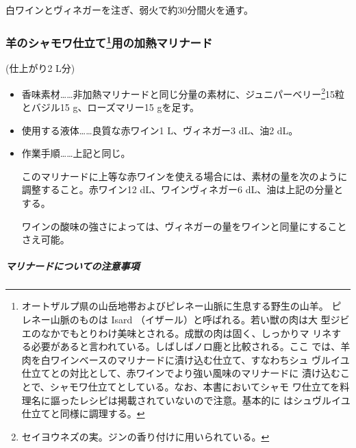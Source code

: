 \begin{recette}
\begin{itemize}
  白ワインとヴィネガーを注ぎ、弱火で約30分間火を通す。
\end{itemize}

\hypertarget{marinade-cuite-pour-le-mouton-en-chamois}{%
\subsubsection[羊のシャモワ仕立て用の加熱マリナード]{\texorpdfstring{羊のシャモワ仕立て\footnote{オートザルプ県の山岳地帯およびピレネー山脈に生息する野生の山羊。
  ピレネー山脈のものは Isard （イザール）と呼ばれる。若い獣の肉は大
  型ジビエのなかでもとりわけ美味とされる。成獣の肉は固く、しっかりマ
  リネする必要があると言われている。しばしばノロ鹿と比較される。ここ
  では、羊肉を白ワインベースのマリナードに漬け込む仕立て、すなわちシュ
  ヴルイユ仕立てとの対比として、赤ワインでより強い風味のマリナードに
  漬け込むことで、シャモワ仕立てとしている。なお、本書においてシャモ
  ワ仕立てを料理名に謳ったレシピは掲載されていないので注意。基本的に
  はシュヴルイユ仕立てと同様に調理する。}用の加熱マリナード}{羊のシャモワ仕立て用の加熱マリナード}}\label{marinade-cuite-pour-le-mouton-en-chamois}}



(仕上がり2 L分)

\begin{itemize}
\item
  香味素材\ldots{}\ldots{}非加熱マリナードと同じ分量の素材に、ジュニパーベリー\footnote{セイヨウネズの実。ジンの香り付けに用いられている。}15粒とバジル15
  g、ローズマリー15 gを足す。
\item
  使用する液体\ldots{}\ldots{}良質な赤ワイン1\undemi{} L、ヴィネガー3
  dL、油2\undemi{} dL。
\item
  作業手順\ldots{}\ldots{}上記と同じ。

  このマリナードに上等な赤ワインを使える場合には、素材の量を次のように
  調整すること。赤ワイン12 dL、ワインヴィネガー6 dL、油は上記の分量と
  する。

  ワインの酸味の強さによっては、ヴィネガーの量をワインと同量にすることさえ可能。
\end{itemize}

\hypertarget{observation-sur-les-marinades}{%
\subparagraph{マリナードについての注意事項}\label{observation-sur-les-marinades}}


\end{recette}
